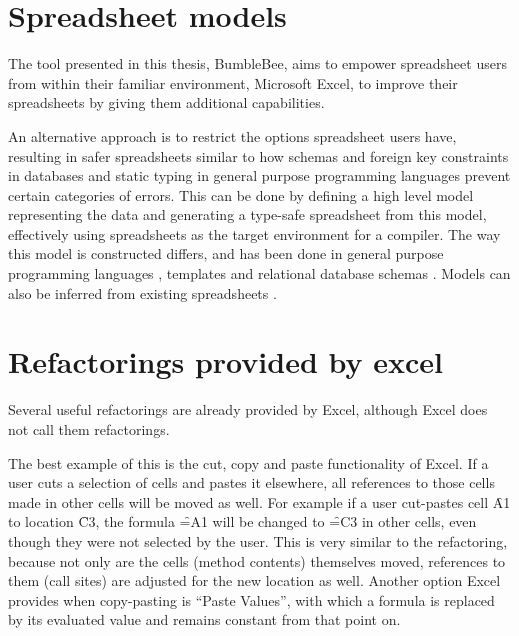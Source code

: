 \section{Spreadsheet models}

The tool presented in this thesis, BumbleBee, aims to empower spreadsheet users from within their familiar environment, Microsoft Excel, to improve their spreadsheets by giving them additional capabilities.

\newpage

An alternative approach is to restrict the options spreadsheet users have, resulting in safer spreadsheets similar to how schemas and foreign key constraints in databases and static typing in general purpose programming languages prevent certain categories of errors.
This can be done by defining a high level model representing the data and generating a type-safe spreadsheet from this model, effectively using spreadsheets as the target environment for a compiler.
The way this model is constructed differs, and has been done in general purpose programming languages \cite{paine2001ensuring, paine2006rapid}, templates \cite{engels2005classsheets, erwig2006gencel, bals2007classsheets, cunha2011type, cunha2011embedding, cunha2014model} and relational database schemas \cite{cunha2009spreadsheets}.
Models can also be inferred from existing spreadsheets \cite{abraham2006inferring,cunha2010automatically}.

\section{Refactorings provided by excel}

Several useful refactorings are already provided by Excel, although Excel does not call them refactorings.

The best example of this is the cut, copy and paste functionality of Excel.
If a user cuts a selection of cells and pastes it elsewhere, all references to those cells made in other cells will be moved as well.
For example if a user cut-pastes cell \f{A1} to location \f{C3}, the formula \f{=A1} will be changed to \f{=C3} in other cells, even though they were not selected by the user.
This is very similar to the  \cite{fowler1999refactoring} refactoring, because not only are the cells (method contents) themselves moved, references to them (call sites) are adjusted for the new location as well.
Another option Excel provides when copy-pasting is ``Paste Values'', with which a formula is replaced by its evaluated value and remains constant from that point on.

